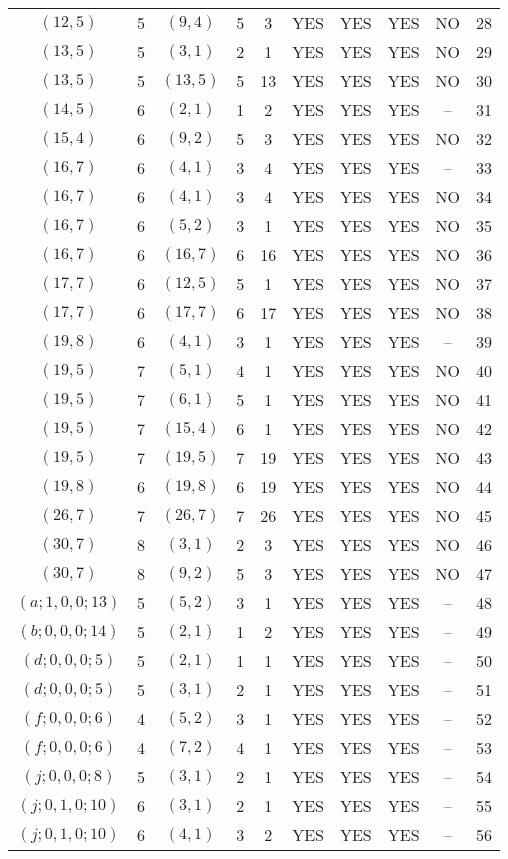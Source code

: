 \begin{longtable}{|c|c|c|c|c|c|c|c|c|c|}
$(12, 5)$ & 5 & $(9, 4)$ & 5 & 3 & YES & YES & YES & NO & 28\\
$(13, 5)$ & 5 & $(3, 1)$ & 2 & 1 & YES & YES & YES & NO & 29\\
$(13, 5)$ & 5 & $(13, 5)$ & 5 & 13 & YES & YES & YES & NO & 30\\
$(14, 5)$ & 6 & $(2, 1)$ & 1 & 2 & YES & YES & YES & -- & 31\\
$(15, 4)$ & 6 & $(9, 2)$ & 5 & 3 & YES & YES & YES & NO & 32\\
$(16, 7)$ & 6 & $(4, 1)$ & 3 & 4 & YES & YES & YES & -- & 33\\
$(16, 7)$ & 6 & $(4, 1)$ & 3 & 4 & YES & YES & YES & NO & 34\\
$(16, 7)$ & 6 & $(5, 2)$ & 3 & 1 & YES & YES & YES & NO & 35\\
$(16, 7)$ & 6 & $(16, 7)$ & 6 & 16 & YES & YES & YES & NO & 36\\
$(17, 7)$ & 6 & $(12, 5)$ & 5 & 1 & YES & YES & YES & NO & 37\\
$(17, 7)$ & 6 & $(17, 7)$ & 6 & 17 & YES & YES & YES & NO & 38\\
$(19, 8)$ & 6 & $(4, 1)$ & 3 & 1 & YES & YES & YES & -- & 39\\
$(19, 5)$ & 7 & $(5, 1)$ & 4 & 1 & YES & YES & YES & NO & 40\\
$(19, 5)$ & 7 & $(6, 1)$ & 5 & 1 & YES & YES & YES & NO & 41\\
$(19, 5)$ & 7 & $(15, 4)$ & 6 & 1 & YES & YES & YES & NO & 42\\
$(19, 5)$ & 7 & $(19, 5)$ & 7 & 19 & YES & YES & YES & NO & 43\\
$(19, 8)$ & 6 & $(19, 8)$ & 6 & 19 & YES & YES & YES & NO & 44\\
$(26, 7)$ & 7 & $(26, 7)$ & 7 & 26 & YES & YES & YES & NO & 45\\
$(30, 7)$ & 8 & $(3, 1)$ & 2 & 3 & YES & YES & YES & NO & 46\\
$(30, 7)$ & 8 & $(9, 2)$ & 5 & 3 & YES & YES & YES & NO & 47\\
$(a; 1, 0, 0; 13)$ & 5 & $(5, 2)$ & 3 & 1 & YES & YES & YES & -- & 48\\
$(b; 0, 0, 0; 14)$ & 5 & $(2, 1)$ & 1 & 2 & YES & YES & YES & -- & 49\\
$(d; 0, 0, 0; 5)$ & 5 & $(2, 1)$ & 1 & 1 & YES & YES & YES & -- & 50\\
$(d; 0, 0, 0; 5)$ & 5 & $(3, 1)$ & 2 & 1 & YES & YES & YES & -- & 51\\
$(f; 0, 0, 0; 6)$ & 4 & $(5, 2)$ & 3 & 1 & YES & YES & YES & -- & 52\\
$(f; 0, 0, 0; 6)$ & 4 & $(7, 2)$ & 4 & 1 & YES & YES & YES & -- & 53\\
$(j; 0, 0, 0; 8)$ & 5 & $(3, 1)$ & 2 & 1 & YES & YES & YES & -- & 54\\
$(j; 0, 1, 0; 10)$ & 6 & $(3, 1)$ & 2 & 1 & YES & YES & YES & -- & 55\\
$(j; 0, 1, 0; 10)$ & 6 & $(4, 1)$ & 3 & 2 & YES & YES & YES & -- & 56
\end{longtable}
